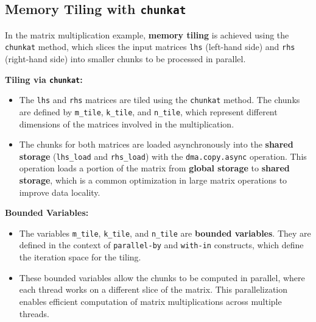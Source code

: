 \subsection*{Memory Tiling with \texttt{chunkat}}

In the matrix multiplication example, \textbf{memory tiling} is achieved using the \texttt{chunkat} method, which slices the input matrices \texttt{lhs} (left-hand side) and \texttt{rhs} (right-hand side) into smaller chunks to be processed in parallel.

\noindent\textbf{Tiling via \texttt{chunkat}:}\par

\begin{itemize}[leftmargin=1.6em]
\item The \texttt{lhs} and \texttt{rhs} matrices are tiled using the \texttt{chunkat} method. The chunks are defined by \texttt{m\_tile}, \texttt{k\_tile}, and \texttt{n\_tile}, which represent different dimensions of the matrices involved in the multiplication.
\item The chunks for both matrices are loaded asynchronously into the \textbf{shared storage} (\texttt{lhs\_load} and \texttt{rhs\_load}) with the \texttt{dma.copy.async} operation. This operation loads a portion of the matrix from \textbf{global storage} to \textbf{shared storage}, which is a common optimization in large matrix operations to improve data locality.
\end{itemize}

\noindent\textbf{Bounded Variables:}\par

\begin{itemize}[leftmargin=1.6em]
\item The variables \texttt{m\_tile}, \texttt{k\_tile}, and \texttt{n\_tile} are \textbf{bounded variables}. They are defined in the context of \texttt{parallel-by} and \texttt{with-in} constructs, which define the iteration space for the tiling.
\item These bounded variables allow the chunks to be computed in parallel, where each thread works on a different slice of the matrix. This parallelization enables efficient computation of matrix multiplications across multiple threads.
\end{itemize}
